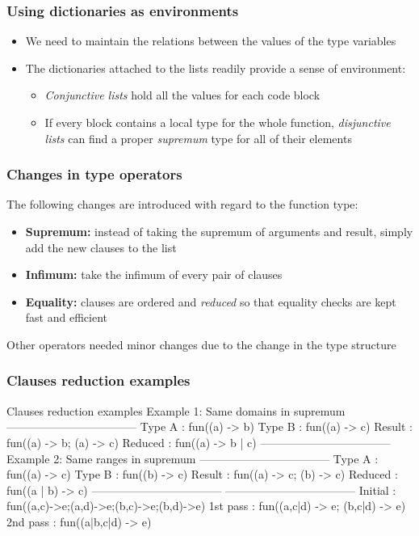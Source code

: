 \documentclass{beamer}
\begin{document}
\begin{frame}
  \frametitle{Using dictionaries as environments}
  \begin{itemize}
    \item We need to maintain the relations between the values of the
      type variables \pause
    \item The dictionaries attached to the lists readily provide a
      sense of environment: \pause
      \begin{itemize}
      \item \emph{Conjunctive lists} hold all the values for each code
        block \pause
      \item If every block contains a local type for the whole
        function, \emph{disjunctive lists} can find a proper
        \emph{supremum} type for all of their elements
      \end{itemize}
  \end{itemize}
\end{frame}

\begin{frame}
  \frametitle{Changes in type operators} 
  The following changes are introduced with regard to the function
  type: \pause
  \begin{itemize}
  \item \textbf{Supremum:} instead of taking the supremum of arguments
    and result, simply add the new clauses to the list \pause
  \item \textbf{Infimum:} take the infimum of every pair of clauses
    \pause
  \item \textbf{Equality:} clauses are ordered and \emph{reduced} so
    that equality checks are kept fast and efficient
  \end{itemize} 
  Other operators needed minor changes due to the change in the type
  structure
\end{frame}

\begin{frame}[fragile]
  \frametitle{Clauses reduction examples}
\begin{code}{Clauses reduction examples}
  Example 1: Same domains in supremum
  -----------------------------------
  Type A  : fun((a) -> b)
  Type B  : fun((a) -> c)
  Result  : fun((a) -> b; (a) -> c)
  Reduced : fun((a) -> b | c)
  -----------------------------------
  Example 2: Same ranges in supremum
  -----------------------------------
  Type A  : fun((a) -> c)
  Type B  : fun((b) -> c)
  Result  : fun((a) -> c; (b) -> c)
  Reduced : fun((a | b) -> c)
  -----------------------------------
  -----------------------------------
  Initial  : fun((a,c)->e;(a,d)->e;(b,c)->e;(b,d)->e)
  1st pass : fun((a,c|d) -> e; (b,c|d) -> e)
  2nd pass : fun((a|b,c|d) -> e)
\end{code}
\end{frame}
\end{document}
